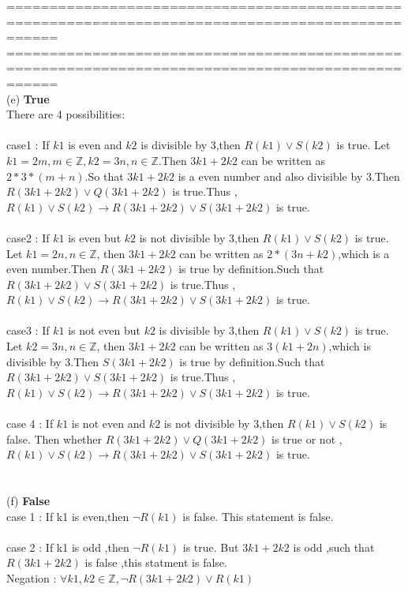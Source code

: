 \documentclass[12pt,a4paper]{article}
\begin{document}
==================================================================================================
\newpage
==================================================================================================
\\
(e) \textbf{True}\\
There are 4 possibilities:\\\\
case1 : If $k1$ is even and $k2$ is divisible by 3,then $R(k1) \lor S(k2)$ is true. Let $k1 = 2m,m \in \mathbb{Z},k2 = 3n, n \in \mathbb{Z}$.Then $3k1 + 2k2$ can be written as $2 * 3 * (m + n)$.So that $3k1 + 2k2$ is a even number and also divisible by 3.Then 
$R(3k1 + 2k2) \lor Q(3k1 + 2k2)$ is true.Thus ,  $R(k1) \lor S(k2) \rightarrow R(3k1 +2k2) \lor S(3k1 + 2k2)$ is true. \\\\
case2 : If $k1$ is even but $k2$ is not divisible by 3,then $R(k1) \lor S(k2)$ is true.  Let $k1 = 2n , n \in \mathbb{Z}$,
then $3k1 + 2k2$ can be written as $2*(3n + k2)$,which is a even number.Then $R(3k1 + 2k2)$ is  true by definition.Such that $R(3k1 + 2k2) \lor S(3k1 +2k2)$ is true.Thus ,  $R(k1) \lor S(k2) \rightarrow R(3k1 +2k2) \lor S(3k1 + 2k2)$ is true. \\\\
case3 : If $k1$ is not even but $k2$ is divisible by 3,then $R(k1) \lor S(k2)$ is true.  Let $k2 = 3n , n \in \mathbb{Z}$,
then $3k1 + 2k2$ can be written as $3(k1 + 2n)$,which is divisible by 3.Then $S(3k1 + 2k2)$ is  true by definition.Such that $R(3k1 + 2k2) \lor S(3k1 +2k2)$ is true.Thus ,  $R(k1) \lor S(k2) \rightarrow R(3k1 +2k2) \lor S(3k1 + 2k2)$ is true. \\\\
case 4 : If $k1$ is not even and $k2$ is not divisible by 3,then $R(k1) \lor S(k2)$ is false. Then whether
$R(3k1 + 2k2) \lor Q(3k1 + 2k2)$ is true or not  , $R(k1) \lor S(k2) \rightarrow R(3k1 +2k2) \lor S(3k1 + 2k2)$ is true. \\\\\\
(f) \textbf{False}\\
case 1 : If k1 is even,then $\neg R(k1)$ is false. This statement is false.\\\\
case 2 : If k1 is odd ,then $\neg R(k1)$ is true. But $3k1 + 2k2$ is odd ,such that $R(3k1 + 2k2)$ is false ,this statment is false.\\
Negation : $\forall k1,k2 \in \mathbb{Z},\neg R(3k1 + 2k2) \lor R(k1)$
\end{document}
